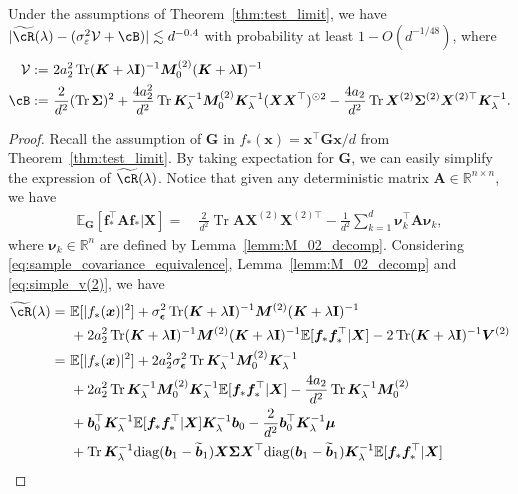 \documentclass[twoside,11pt]{article}
\newcommand{\bepsilon}{\boldsymbol{\epsilon}}
\newcommand{\R}{\mathbb{R}}
\newcommand{\E}{\mathbb{E}}
\def\bI{{\mathbf I}}
\newcommand{\diag}{\text{diag}}
\def\bA{{\boldsymbol A}}
\def\bG{{\boldsymbol G}}
\def\vf{{\boldsymbol f}}
\def\bK{{\boldsymbol K}}
\def\bV{{\boldsymbol V}}
\def\bX{{\boldsymbol X}}
\def\bM{{\boldsymbol M}}
\def\bb{{\boldsymbol b}}
\def\bx{{\boldsymbol x}}
\def\bSigma{{\boldsymbol \Sigma}}
\def\cV{{\mathcal V}}
\def\cV{{\mathcal V}}
\renewcommand{\bK}{\boldsymbol{K}}
\newcommand{\Tr}{\operatorname{Tr}}
\newcommand{\vmu}{\mbi{\mu}}
\newcommand{\vnu}{\mbi{\nu}}
\newcommand{\1}{\mathbf{1}}
\def\mbi#1{\boldsymbol{#1}}
\def\mbi#1{\boldsymbol{#1}} %
\begin{document}
\begin{lemma}\label{lemm:risk_decomp}
    Under the assumptions of Theorem~\ref{thm:test_limit}, we have $|\widetilde\cR(\lambda)-( \sigma_\varepsilon^2\cV+ \cB)|\lesssim d^{-0.4}$ with probability at least $1-O(d^{-1/48})$, where
\begin{align}
    \cV:=~& 2a_2^2\Tr(\bK+\lambda\bI)^{-1} \bM_0^{(2)} (\bK+\lambda\bI)^{-1} \\
    \cB:=~&  \frac{2}{d^2}(\Tr\bSigma)^2 +\frac{4a_2^2}{d^2}\Tr\bK_{\lambda}^{-1}\bM_0^{(2)}\bK_{\lambda}^{-1}(\bX \bX^\top)^{\odot 2}- \frac{4a_2}{d^2}\Tr\bX^{(2)}\bSigma^{(2)}\bX^{(2)\top}\bK_{\lambda}^{-1}.
\end{align}

\end{lemma}
\begin{proof}
Recall the assumption of $\bG$ in $f_*(\bx)=\bx^\top\bG\bx/d$ from Theorem~\ref{thm:test_limit}. By taking expectation for $\bG$, we can easily simplify the expression of $ \widetilde\cR(\lambda) $. 
Notice that given any deterministic matrix $\bA\in\R^{n\times n}$, we have
\begin{align}
    \E_{\bG}[\vf_*^\top\bA\vf_*|\bX]=~& \frac{2}{d^2}\Tr\bA\bX^{(2)}\bX^{(2)\top}-\frac{1}{d^2}\sum_{k=1}^d\vnu_k^\top\bA\vnu_k, \label{eq:fAf_control} 
\end{align}where $\vnu_k\in\R^n$ are defined by Lemma~\ref{lemm:M_02_decomp}. Considering \eqref{eq:sample_covariance_equivalence}, Lemma~\ref{lemm:M_02_decomp} and \eqref{eq:simple_v(2)}, we have
\begin{align}
     \widetilde\cR(\lambda) =~& \E[|f_*(\bx)|^2]+\sigma^2_{\bepsilon}\Tr(\bK+\lambda\bI)^{-1}\bM^{(2)}(\bK +\lambda\bI)^{-1}\\
    ~&   + 2a_2^2\Tr(\bK+\lambda\bI)^{-1}\bM^{(2)}(\bK +\lambda\bI)^{-1} \E[\vf_*\vf_*^\top|\bX] 
     -2\Tr(\bK +\lambda\bI)^{-1}\bV^{(2)}\\
     =~& \E[|f_*(\bx)|^2]+2a_2^2\sigma^2_{\bepsilon}\Tr\bK_{\lambda}^{-1}\bM_0^{(2)}\bK_{\lambda}^{-1}\\
    ~&   + 2a_2^2\Tr\bK_{\lambda}^{-1}\bM_0^{(2)}\bK_{\lambda}^{-1} \E[\vf_*\vf_*^\top|\bX] 
     -\frac{4a_2}{d^2}\Tr\bK_{\lambda}^{-1}\bM_0^{(2)}\\
     ~& +  \bb_0^\top\bK_{\lambda}^{-1} \E[\vf_*\vf_*^\top|\bX]\bK_{\lambda}^{-1} \bb_0-\frac{2}{d^2}\bb_0^\top\bK_{\lambda}^{-1}\vmu\\
     ~& +\Tr\bK_{\lambda}^{-1}\diag(\bb_1-\widetilde\bb_1)\bX\bSigma\bX^\top\diag(\bb_1-\widetilde\bb_1) \bK_{\lambda}^{-1} \E[\vf_*\vf_*^\top|\bX] \\

\end{align}
\end{proof}
\end{document}
